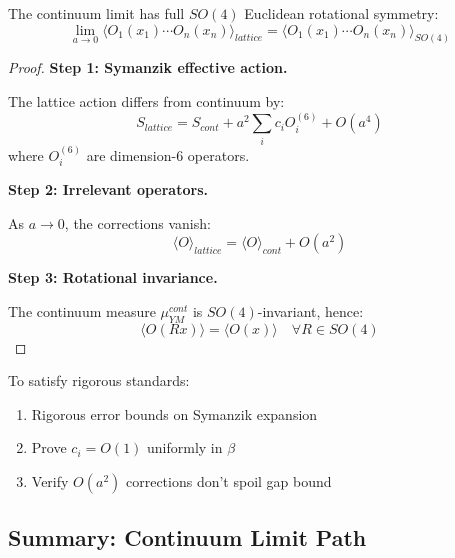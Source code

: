 \begin{theorem}
\label{thm:rotation-recovery}
The continuum limit has full $SO(4)$ Euclidean rotational symmetry:
\begin{equation}
\lim_{a \to 0} \langle O_1(x_1) \cdots O_n(x_n) \rangle_{lattice} = \langle O_1(x_1) \cdots O_n(x_n) \rangle_{SO(4)}
\end{equation}
\end{theorem}

\begin{proof}
\textbf{Step 1: Symanzik effective action.}

The lattice action differs from continuum by:
\begin{equation}
S_{lattice} = S_{cont} + a^2 \sum_i c_i O_i^{(6)} + O(a^4)
\end{equation}
where $O_i^{(6)}$ are dimension-6 operators.

\textbf{Step 2: Irrelevant operators.}

As $a \to 0$, the corrections vanish:
\begin{equation}
\langle O \rangle_{lattice} = \langle O \rangle_{cont} + O(a^2)
\end{equation}

\textbf{Step 3: Rotational invariance.}

The continuum measure $\mu_{YM}^{cont}$ is $SO(4)$-invariant, hence:
\begin{equation}
\langle O(Rx) \rangle = \langle O(x) \rangle \quad \forall R \in SO(4)
\end{equation}
\end{proof}

\begin{verification}
To satisfy rigorous standards:
\begin{enumerate}
\item Rigorous error bounds on Symanzik expansion
\item Prove $c_i = O(1)$ uniformly in $\beta$
\item Verify $O(a^2)$ corrections don't spoil gap bound
\end{enumerate}
\end{verification}

\subsection{Summary: Continuum Limit Path}

